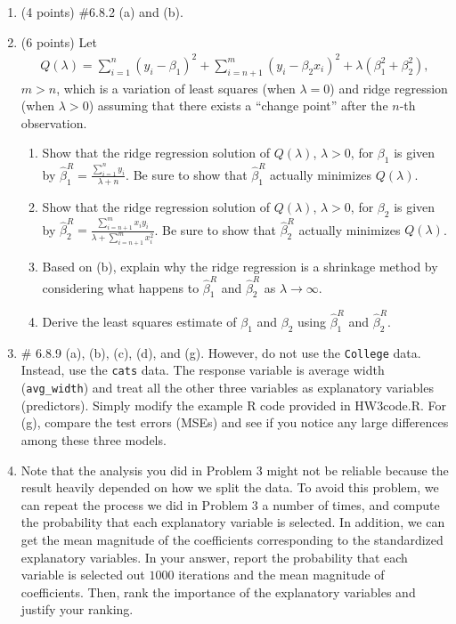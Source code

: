 \documentclass[12pt]{article}
\begin{document}
\begin{enumerate}
\item (4 points) \#6.8.2 (a) and (b).\\

\item (6 points) Let
\begin{eqnarray*}
Q (\lambda)= \sum_{i=1}^n (y_i - \beta_1)^2 +  \sum_{i=n+1}^m (y_i - \beta_2 x_i)^2 + \lambda (\beta_1^2 + \beta_2^2),
\end{eqnarray*}
$m > n$, which is a variation of least squares (when $\lambda = 0$) and ridge regression (when $\lambda > 0$) assuming that there exists a ``change point'' after the $n$-th observation.

\begin{enumerate}
\item Show that the ridge regression solution of $Q(\lambda)$, $\lambda > 0$, for $\beta_1$ is given by $\hat{\beta}_1^R = \frac{\sum_{i=1}^n y_i}{\lambda + n}$. Be sure to show that $\hat{\beta}_1^R$ actually minimizes $Q(\lambda)$.
\item Show that the ridge regression solution of $Q(\lambda)$, $\lambda > 0$, for $\beta_2$ is given by $\hat{\beta}_2^R = \frac{\sum_{i=n+1}^m x_iy_i}{\lambda + \sum_{i=n+1}^m x_i^2}$. Be sure to show that $\hat{\beta}_2^R$ actually minimizes $Q(\lambda)$.
\item Based on (b), explain why the ridge regression is a shrinkage method by considering what happens to $\hat{\beta}_1^R$ and $\hat{\beta}_2^R$ as $\lambda \to \infty$.
\item Derive the least squares estimate of $\beta_1$ and $\beta_2$ using $\hat{\beta}_1^R$ and $\hat{\beta}_2^R$.
\end{enumerate}

\item \# 6.8.9 (a), (b), (c), (d), and (g). However, do not use the {\tt College} data. Instead, use the {\tt cats} data. The response variable is average width ({\tt avg\_width}) and treat all the other three variables as explanatory variables (predictors). Simply modify the example R code provided in HW3code.R. For (g), compare the test errors (MSEs) and see if you notice any large differences among these three models.

\item Note that the analysis you did in Problem 3 might not be reliable because the result heavily depended on how we split the data. To avoid this problem, we can repeat the process we did in Problem 3 a number of times, and compute the probability that each explanatory variable is selected. In addition, we can get the mean magnitude of the coefficients corresponding to the standardized explanatory variables. In your answer, report the probability that each variable is selected out $1000$ iterations and the mean magnitude of coefficients. Then, rank the importance of the explanatory variables and justify your ranking.\\


\end{enumerate}
\end{document}
